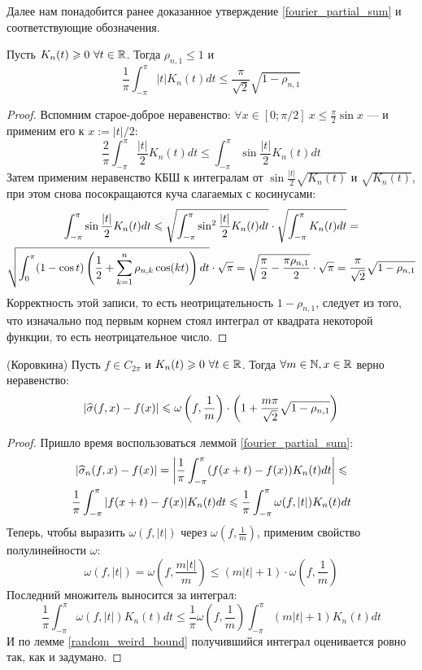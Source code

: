 \begin{note}
	Далее нам понадобится ранее доказанное утверждение \ref{fourier_partial_sum} и соответствующие обозначения.
\end{note}

\begin{lemma} \label{random_weird_bound}
	Пусть $K_n(t) \geqslant 0 \ \forall t \in \mathbb{R}$. Тогда $\rho_{n,1} \leq 1$ и
	\[
		\frac{1}{\pi} \int_{-\pi}^\pi |t| K_n(t) dt \leq \frac{\pi}{\sqrt{2}}\sqrt{1 - \rho_{n,1}}
	\]
\end{lemma}

\begin{proof}
	Вспомним старое-доброе неравенство: $\forall x \in [0; \pi/2] \ x \leq \frac{\pi}{2}\sin x$ --- и применим его к $x := |t|/2$:
	\[
		\frac{2}{\pi} \int_{-\pi}^\pi \frac{|t|}{2} K_n(t) dt \leq \int_{-\pi}^\pi \sin\frac{|t|}{2} K_n(t) dt
	\]
	Затем применим неравенство КБШ к интегралам от $\sin\frac{|t|}{2} \sqrt{K_n(t)}$ и $\sqrt{K_n(t)}$, при этом снова посокращаются куча слагаемых с косинусами:
	\begin{multline*}
		\int_{-\pi}^\pi \sin\frac{|t|}{2} K_n(t) dt \leqslant \sqrt{\int_{-\pi}^\pi \sin^2\frac{|t|}{2} K_n(t) dt} \cdot \sqrt{\int_{-\pi}^\pi K_n(t) dt} = \\
		\sqrt{\int_{0}^\pi (1 - \cos t)\left(\frac{1}{2} + \sum_{k=1}^{n} \rho_{n,k}\cos(kt)\right) dt} \cdot \sqrt\pi = \sqrt{\frac{\pi}{2} - \frac{\pi\rho_{n,1}}{2}}\cdot\sqrt\pi = \frac{\pi}{\sqrt{2}}\sqrt{1 - \rho_{n,1}}
	\end{multline*}
	Корректность этой записи, то есть неотрицательность $1 - \rho_{n,1}$, следует из того, что изначально под первым корнем стоял интеграл от квадрата некоторой функции, то есть неотрицательное число.
\end{proof}

\begin{lemma} (Коровкина) \label{korovkin's_weird_bound}
	Пусть $f \in C_{2\pi}$ и $K_n(t) \geqslant 0 \ \forall t \in \mathbb{R}$. Тогда $\forall m \in \mathbb{N}, x \in \mathbb{R}$ верно неравенство:
	\[
		|\widehat\sigma(f, x) - f(x)| \leqslant \omega\left(f, \frac{1}{m}\right) \cdot \left(1 + \frac{m\pi}{\sqrt{2}}\sqrt{1 - \rho_{n,1}}\right)
	\]
\end{lemma}

\begin{proof}
	Пришло время воспользоваться леммой \ref{fourier_partial_sum}:
	\begin{multline*}
		|\widehat\sigma_n(f, x) - f(x)| = \left|\frac{1}{\pi} \int_{-\pi}^\pi (f(x+t) - f(x))K_n(t)dt\right| \leqslant \\ \frac{1}{\pi} \int_{-\pi}^\pi |f(x+t) - f(x)|K_n(t)dt \leqslant \frac{1}{\pi} \int_{-\pi}^\pi \omega(f, |t|)K_n(t)dt
	\end{multline*}
	Теперь, чтобы выразить $\omega(f, |t|)$ через $\omega(f, \frac{1}{m})$, применим свойство полулинейности $\omega$:
	\[
		\omega(f, |t|) = \omega(f, \frac{m|t|}{m}) \leq (m|t| + 1)\cdot \omega(f, \frac{1}{m})
	\]
	Последний множитель выносится за интеграл:
	\[
		\frac{1}{\pi} \int_{-\pi}^\pi \omega(f, |t|)K_n(t)dt \leq \frac{1}{\pi} \omega(f, \frac{1}{m}) \int_{-\pi}^\pi (m|t| + 1)K_n(t)dt
	\]
	И по лемме \ref{random_weird_bound} получившийся интеграл оценивается ровно так, как и задумано.
\end{proof}

